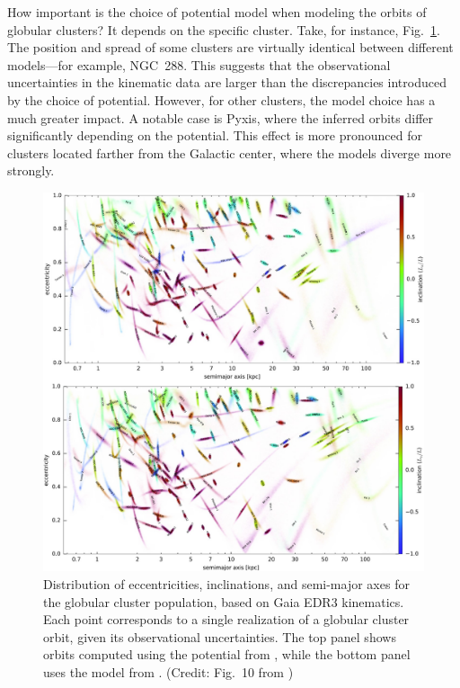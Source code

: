         How important is the choice of potential model when modeling the orbits of globular clusters? It depends on the specific cluster. Take, for instance, Fig.~\ref{fig:vasiliev_2021_EDR3_GCS_FIG_10}. The position and spread of some clusters are virtually identical between different models—for example, NGC~288. This suggests that the observational uncertainties in the kinematic data are larger than the discrepancies introduced by the choice of potential. However, for other clusters, the model choice has a much greater impact. A notable case is Pyxis, where the inferred orbits differ significantly depending on the potential. This effect is more pronounced for clusters located farther from the Galactic center, where the models diverge more strongly.

        \begin{figure}
            \includegraphics[width=\linewidth]{images/vasiliev_2021_EDR3_GCS_FIG_10.jpeg}
            \caption{Distribution of eccentricities, inclinations, and semi-major axes for the globular cluster population, based on Gaia EDR3 kinematics. Each point corresponds to a single realization of a globular cluster orbit, given its observational uncertainties. The top panel shows orbits computed using the potential from \citet{2017MNRAS.465...76M}, while the bottom panel uses the model from \citet{2015ApJS..216...29B}. (Credit: Fig.~10 from \citet{2021MNRAS.505.5978V})}
            \label{fig:vasiliev_2021_EDR3_GCS_FIG_10}
        \end{figure}

